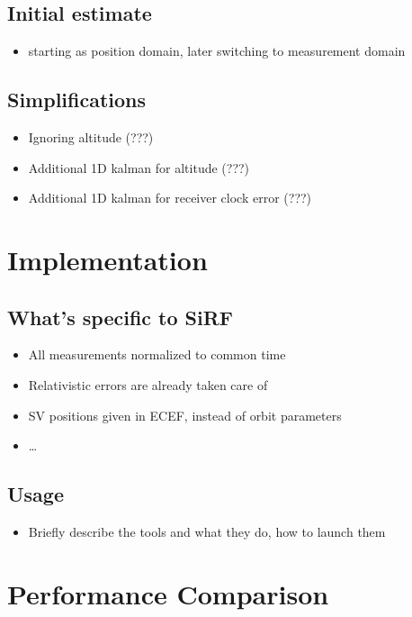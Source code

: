 \subsection{Initial estimate}
\begin{itemize}
\item starting as position domain, later switching to measurement domain
\end{itemize}

\subsection{Simplifications}
\begin{itemize}
\item Ignoring altitude (???)
\item Additional 1D kalman for altitude (???)
\item Additional 1D kalman for receiver clock error (???)
\end{itemize}

\section{Implementation}

\subsection{What's specific to SiRF}
\begin{itemize}
\item All measurements normalized to common time
\item Relativistic errors are already taken care of
\item SV positions given in ECEF, instead of orbit parameters
\item \ldots
\end{itemize}

\subsection{Usage}
\begin{itemize}
\item Briefly describe the tools and what they do, how to launch them
\end{itemize}

\section{Performance Comparison}
